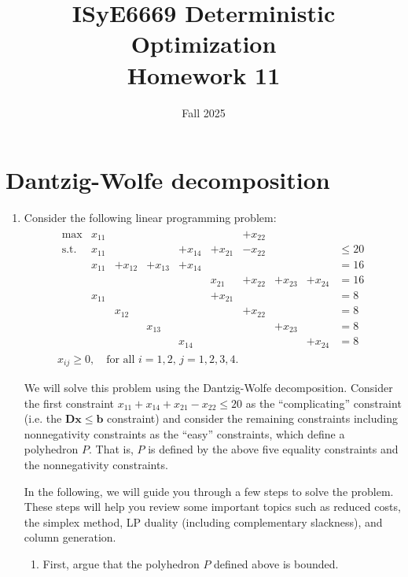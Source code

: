 \documentclass[11pt]{article}
\title{ISyE6669 Deterministic Optimization\\ Homework 11}
\author{Fall 2025}
\date{}
\newcommand{\mb}[1]{\ensuremath{\boldsymbol{#1}}}
\begin{document}
\maketitle

\section*{Dantzig-Wolfe decomposition}
\begin{enumerate}
\item Consider the following linear programming problem:
\begin{eqnarray*}
\begin{array}{cccccccccc}
\max & x_{11} &&&&& + x_{22} &&&    \\
\text{s.t.} & x_{11} &&& + x_{14} & + x_{21} & - x_{22} &&& \leq 20 \\
            & x_{11} & + x_{12} & +x_{13} & +x_{14} && & & & = 16 \\
            &&&&& x_{21} & + x_{22} & + x_{23} & + x_{24} & = 16  \\
            & x_{11} & & & & + x_{21} &&&& = 8 \\
            & & x_{12} & & & & + x_{22} &&& = 8 \\
            &&& x_{13} &&&& + x_{23} && = 8 \\
            &&&& x_{14} &&&& + x_{24} & = 8
\end{array}\\
x_{ij} \geq 0, \quad \text{for all } i=1,2, \, j=1,2, 3, 4.
\end{eqnarray*}





We will solve this problem using the Dantzig-Wolfe decomposition. Consider the first constraint $x_{11}+x_{14}+x_{21}-x_{22}\leq 20$ as the ``complicating'' constraint (i.e. the $\mb{Dx}\leq\mb{b}$ constraint) and consider the remaining constraints including nonnegativity constraints as the ``easy'' constraints, which define a polyhedron $P$. That is, $P$ is defined by the above five equality constraints and the nonnegativity constraints.

In the following, we will guide you through a few steps to solve the problem. These steps will help you review some important topics such as reduced costs, the simplex method, LP duality (including complementary slackness), and column generation. 

\begin{enumerate}
\item First, argue that the polyhedron $P$ defined above is bounded.


\end{enumerate}
\end{enumerate}
\end{document}
